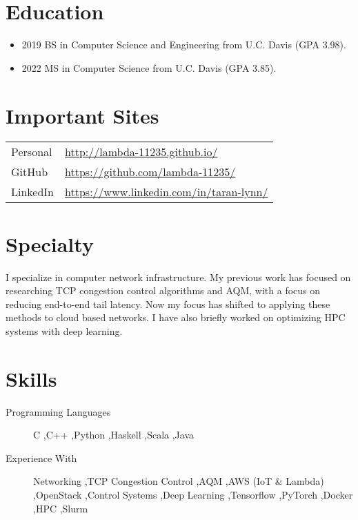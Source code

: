 \documentclass{resume}
\begin{document}

\section*{Education}

\begin{itemize}
\item 2019 BS in Computer Science and Engineering from U.C. Davis
  (GPA 3.98).

\item 2022 MS in Computer Science from U.C. Davis (GPA 3.85).
\end{itemize}

\section*{Important Sites}

\begin{tabular}{ll}
    Personal & \url{http://lambda-11235.github.io/}\\
    GitHub & \url{https://github.com/lambda-11235/}\\
    LinkedIn & \url{https://www.linkedin.com/in/taran-lynn/}\\
\end{tabular}


\section*{Specialty}

I specialize in computer network infrastructure.
My previous work has focused on researching TCP congestion control
algorithms and AQM, with a focus on reducing end-to-end tail latency.
Now my focus has shifted to applying these methods to cloud based networks.
I have also briefly worked on optimizing HPC systems with deep learning.


\section*{Skills}

\begin{description}
    \item[Programming Languages]
      C
      \sep C++
      \sep Python
      \sep Haskell
      \sep Scala
      \sep Java

    \item[Experience With]
      Networking
      \sep TCP Congestion Control
      \sep AQM
      \sep AWS (IoT \& Lambda)
      \sep OpenStack
      \sep Control Systems
      \sep Deep Learning
      \sep Tensorflow
      \sep PyTorch
      \sep Docker
      \sep HPC
      \sep Slurm
\end{description}
\end{document}
